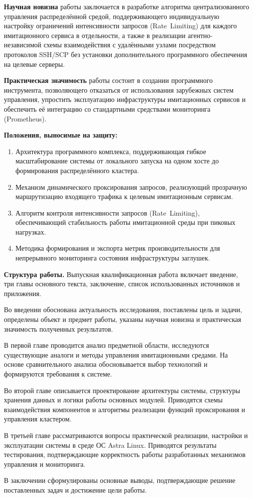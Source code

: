 \textbf{Научная новизна} работы заключается в разработке алгоритма централизованного управления распределённой средой, поддерживающего индивидуальную настройку ограничений интенсивности запросов (Rate~Limiting) для каждого имитационного сервиса в отдельности, а также в реализации агентно-независимой схемы взаимодействия с удалёнными узлами посредством протоколов SSH/SCP без установки дополнительного программного обеспечения на целевые серверы.

\textbf{Практическая значимость} работы состоит в создании программного инструмента, позволяющего отказаться от использования зарубежных систем управления, упростить эксплуатацию инфраструктуры имитационных сервисов и обеспечить её интеграцию со стандартными средствами мониторинга (Prometheus).

\textbf{Положения, выносимые на защиту:}
\begin{enumerate}
  \item Архитектура программного комплекса, поддерживающая гибкое масштабирование системы от локального запуска на одном хосте до формирования распределённого кластера.
  \item Механизм динамического проксирования запросов, реализующий прозрачную маршрутизацию входящего трафика к целевым имитационным сервисам.
  \item Алгоритм контроля интенсивности запросов (Rate~Limiting), обеспечивающий стабильность работы имитационной среды при пиковых нагрузках.
  \item Методика формирования и экспорта метрик производительности для непрерывного мониторинга состояния инфраструктуры заглушек.
\end{enumerate}

\textbf{Структура работы.} Выпускная квалификационная работа включает введение, три главы основного текста, заключение, список использованных источников и приложения.

Во введении обоснована актуальность исследования, поставлены цель и задачи, определены объект и предмет работы, указаны научная новизна и практическая значимость полученных результатов.

В первой главе проводится анализ предметной области, исследуются существующие аналоги и методы управления имитационными средами. На основе сравнительного анализа обосновывается выбор технологий и формируются требования к системе.

Во второй главе описывается проектирование архитектуры системы, структуры хранения данных и логики работы основных модулей. Приводятся схемы взаимодействия компонентов и алгоритмы реализации функций проксирования и управления кластером.

В третьей главе рассматриваются вопросы практической реализации, настройки и эксплуатации системы в среде ОС Astra Linux. Приводятся результаты тестирования, подтверждающие корректность работы разработанных механизмов управления и мониторинга.

В заключении сформулированы основные выводы, подтверждающие решение поставленных задач и достижение цели работы.